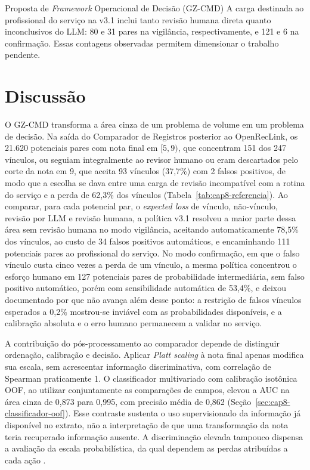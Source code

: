 \begin{chapter}{Proposta de \textit{Framework} Operacional de Decisão (GZ-CMD)}
A carga destinada ao profissional do serviço na v3.1 inclui tanto revisão humana direta quanto inconclusivos do LLM: 80 e 31 pares na vigilância, respectivamente, e 121 e 6 na confirmação. Essas contagens observadas permitem dimensionar o trabalho pendente.

\section{Discussão}
\label{sec:cap8-discussao}

O GZ-CMD transforma a área cinza de um problema de volume em um problema de decisão. Na saída do Comparador de Registros posterior ao OpenRecLink, os 21.620 potenciais pares com nota final em $[5,9)$, que concentram 151 dos 247 vínculos, ou seguiam integralmente ao revisor humano ou eram descartados pelo corte da nota em 9, que aceita 93 vínculos (37,7\%) com 2 falsos positivos, de modo que a escolha se dava entre uma carga de revisão incompatível com a rotina do serviço e a perda de 62,3\% dos vínculos (Tabela~\ref{tab:cap8-referencia}). Ao comparar, para cada potencial par, o \textit{expected loss} de vínculo, não-vínculo, revisão por LLM e revisão humana, a política v3.1 resolveu a maior parte dessa área sem revisão humana no modo vigilância, aceitando automaticamente 78,5\% dos vínculos, ao custo de 34 falsos positivos automáticos, e encaminhando 111 potenciais pares ao profissional do serviço. No modo confirmação, em que o falso vínculo custa cinco vezes a perda de um vínculo, a mesma política concentrou o esforço humano em 127 potenciais pares de probabilidade intermediária, sem falso positivo automático, porém com sensibilidade automática de 53,4\%, e deixou documentado por que não avança além desse ponto: a restrição de falsos vínculos esperados a 0,2\% mostrou-se inviável com as probabilidades disponíveis, e a calibração absoluta e o erro humano permanecem a validar no serviço.

A contribuição do pós-processamento ao comparador depende de distinguir ordenação, calibração e decisão. Aplicar \textit{Platt scaling} à nota final apenas modifica sua escala, sem acrescentar informação discriminativa, com correlação de Spearman praticamente 1. O classificador multivariado com calibração isotônica OOF, ao utilizar conjuntamente as comparações de campos, elevou a AUC na área cinza de 0,873 para 0,995, com precisão média de 0,862 (Seção~\ref{sec:cap8-classificador-oof}). Esse contraste sustenta o uso supervisionado da informação já disponível no extrato, não a interpretação de que uma transformação da nota teria recuperado informação ausente. A discriminação elevada tampouco dispensa a avaliação da escala probabilística, da qual dependem as perdas atribuídas a cada ação \cite{Jardim2026phdrepo}.


\end{chapter}
